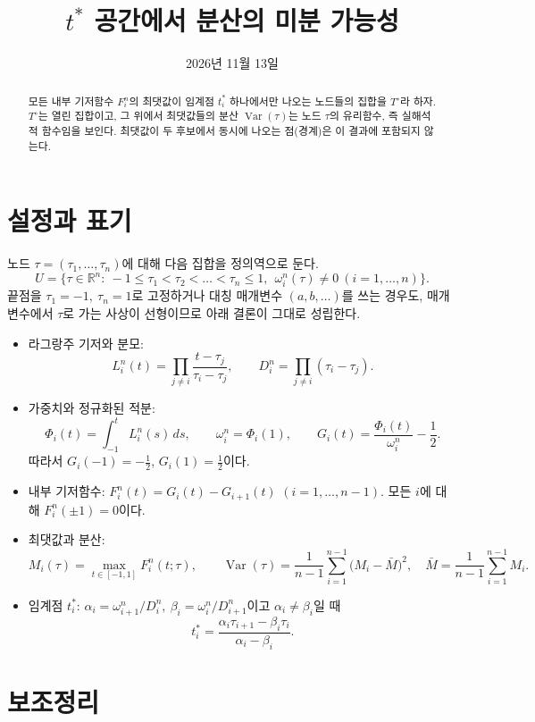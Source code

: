 \documentclass[11pt,a4paper]{article}
\title{$t^*$ 공간에서 분산의 미분 가능성}
\author{}
\date{2026년 11월 13일}
\theoremstyle{definition}
\theoremstyle{remark}
\newcommand{\Var}{\operatorname{Var}}
\newcommand{\R}{\mathbb{R}}
\begin{document}
\maketitle

\begin{abstract}
모든 내부 기저함수 $F_i^n$의 최댓값이 임계점 $t^*_i$ 하나에서만 나오는 노드들의 집합을 $T^\circ$라 하자.
$T^\circ$는 열린 집합이고, 그 위에서 최댓값들의 분산 $\Var(\tau)$는 노드 $\tau$의 유리함수, 즉 실해석적 함수임을 보인다.
최댓값이 두 후보에서 동시에 나오는 점(경계)은 이 결과에 포함되지 않는다.
\end{abstract}

\section{설정과 표기}

노드 $\tau=(\tau_1,\dots,\tau_n)$에 대해 다음 집합을 정의역으로 둔다.
\[
U=\bigl\{\tau\in\R^n:\ -1\le\tau_1<\tau_2<\dots<\tau_n\le 1,\ \ \omega_i^n(\tau)\neq0\ (i=1,\dots,n)\bigr\}.
\]
끝점을 $\tau_1=-1,\ \tau_n=1$로 고정하거나 대칭 매개변수 $(a,b,\dots)$를 쓰는 경우도, 매개변수에서 $\tau$로 가는 사상이 선형이므로 아래 결론이 그대로 성립한다.

\begin{itemize}[leftmargin=*]
\item 라그랑주 기저와 분모:
\[
L_i^n(t)=\prod_{j\ne i}\frac{t-\tau_j}{\tau_i-\tau_j},\qquad D_i^n=\prod_{j\ne i}(\tau_i-\tau_j).
\]
\item 가중치와 정규화된 적분:
\[
\Phi_i(t)=\int_{-1}^{t}L_i^n(s)\,ds,\qquad \omega_i^n=\Phi_i(1),\qquad
G_i(t)=\frac{\Phi_i(t)}{\omega_i^n}-\frac12 .
\]
따라서 $G_i(-1)=-\tfrac12$, $G_i(1)=\tfrac12$이다.
\item 내부 기저함수: $F_i^n(t)=G_i(t)-G_{i+1}(t)$ $(i=1,\dots,n-1)$. 모든 $i$에 대해 $F_i^n(\pm1)=0$이다.
\item 최댓값과 분산:
\[
M_i(\tau)=\max_{t\in[-1,1]}F_i^n(t;\tau),\qquad
\Var(\tau)=\frac1{n-1}\sum_{i=1}^{n-1}\bigl(M_i-\bar M\bigr)^2,\quad \bar M=\frac1{n-1}\sum_{i=1}^{n-1}M_i .
\]
\item 임계점 $t^*_i$: $\alpha_i=\omega_{i+1}^n/D_i^n,\ \beta_i=\omega_i^n/D_{i+1}^n$이고 $\alpha_i\ne\beta_i$일 때
\[
t^*_i=\frac{\alpha_i\tau_{i+1}-\beta_i\tau_i}{\alpha_i-\beta_i}.
\]
\end{itemize}

\section{보조정리}
\end{document}
